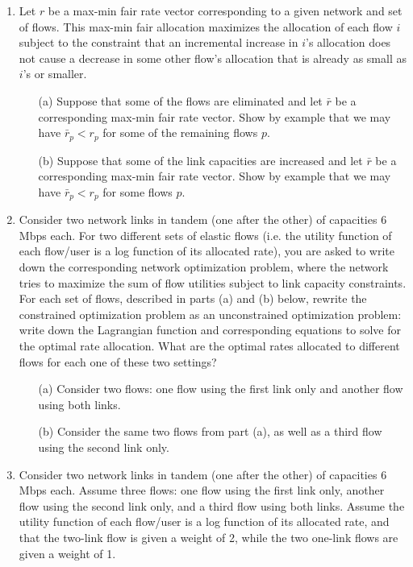 \documentclass{article}
\begin{document}
\begin{enumerate}

\item Let $r$ be a max-min fair rate vector corresponding to a given network and set of flows. This max-min fair allocation maximizes the allocation of each flow $i$ subject to the constraint that an incremental increase in $i$'s allocation does not cause a decrease in some other flow's allocation that is already as small as $i$'s or smaller.

\begin{itemize}
\item[(a)] Suppose that some of the flows are eliminated and let $\bar{r}$ be a corresponding max-min fair rate vector. Show by example that we may have $\bar{r}_p < r_p$ for some of the remaining flows $p$.

\item[(b)] Suppose that some of the link capacities are increased and let $\bar{r}$ be a corresponding max-min fair rate vector. Show by example that we may have  $\bar{r}_p < r_p$ for some flows $p$.
\end{itemize}

\item Consider two network links in tandem (one after the other) of capacities 6 Mbps each. For two different sets of elastic flows (i.e. the utility function of each flow/user is a log function of its allocated rate), you are asked to write down the corresponding network optimization problem, where the network tries to maximize the sum of flow utilities subject to link capacity constraints. For each set of flows, described in parts (a) and (b) below, rewrite the constrained optimization problem as an unconstrained optimization problem: write down the Lagrangian function and corresponding equations to solve for the optimal rate allocation. What are the optimal rates allocated to different flows for each one of these two settings?
\begin{itemize}
\item[(a)] Consider two flows: one flow using the first link only and another flow using both links.

\item[(b)] Consider the same two flows from part (a), as well as a third flow using the second link only.
\end{itemize}

\item  Consider two network links in tandem (one after the other) of capacities 6 Mbps each. 
Assume three flows: one flow using the first link only, another flow  using the second link only,
and a third flow using both links.
Assume the utility function of each flow/user is a log function of its allocated rate, 
and that the two-link flow is given a weight of 2, while the two one-link flows are given a weight of 1.


\end{enumerate}
\end{document}
